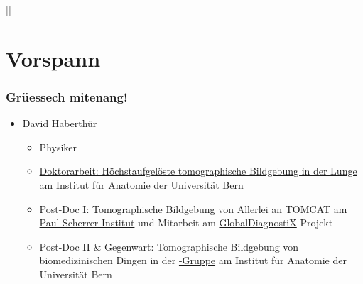 \renewcommand{\bibopenparen}{\addcomma\addspace}
\renewcommand{\bibcloseparen}{\addcomma\addspace}

\DeclareCiteCommand{\footcite}[\mkbibfootnote]{%
	}{%
		\newunit%
		\newunit%
		\printlabeldateextra%
	}{\addsemicolon\space}{%
	}%



{%
	\begin{frame}%
		\maketitle
	\end{frame}%
}

\section{Vorspann}
\begin{frame}
	\frametitle{Grüessech mitenang!}
	\begin{itemize}
		\item David Haberthür
		\begin{itemize}
			\item Physiker
			\item \href{https://boris.unibe.ch/2619/}{Doktorarbeit: Höchstaufgelöste tomographische Bildgebung in der Lunge} am Institut für Anatomie der Universität Bern
			\item Post-Doc I: Tomographische Bildgebung von Allerlei an \href{https://www.psi.ch/sls/tomcat/}{TOMCAT} am \href{https://www.psi.ch/}{Paul Scherrer Institut}
			  und Mitarbeit am \href{http://globaldiagnostix.org}{GlobalDiagnostiX}-Projekt
			\item Post-Doc II \& Gegenwart: Tomographische Bildgebung von biomedizinischen Dingen in der \href{https://www.ana.unibe.ch/forschung/mikroct/research/}{\uct-Gruppe} am Institut für Anatomie der Universität Bern
		\end{itemize}
	\end{itemize}
\end{frame}

